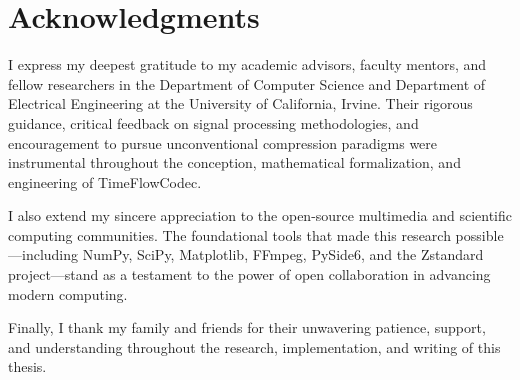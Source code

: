 \chapter*{Acknowledgments}

I express my deepest gratitude to my academic advisors, faculty mentors, and fellow researchers in the Department of Computer Science and Department of Electrical Engineering at the University of California, Irvine. Their rigorous guidance, critical feedback on signal processing methodologies, and encouragement to pursue unconventional compression paradigms were instrumental throughout the conception, mathematical formalization, and engineering of TimeFlowCodec.

I also extend my sincere appreciation to the open-source multimedia and scientific computing communities. The foundational tools that made this research possible---including NumPy, SciPy, Matplotlib, FFmpeg, PySide6, and the Zstandard project---stand as a testament to the power of open collaboration in advancing modern computing.

Finally, I thank my family and friends for their unwavering patience, support, and understanding throughout the research, implementation, and writing of this thesis.
